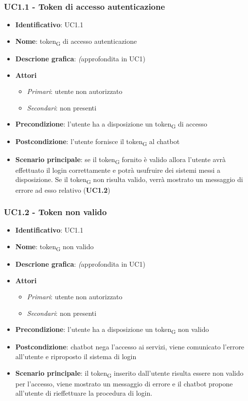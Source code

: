 \subsubsection{UC1.1 - Token di accesso autenticazione}
\begin{itemize}
    \item \textbf{Identificativo}: UC1.1
    \item \textbf{Nome}: token\textsubscript{G} di accesso autenticazione
    \item \textbf{Descrione grafica}: \textit(approfondita in UC1)
    \item \textbf{Attori}
 \begin{itemize} 
    \item \textit{Primari}: utente non autorizzato
    \item \textit{Secondari}: non presenti
 \end{itemize}
 \item \textbf{Precondizione}: l'utente ha a disposizione un token\textsubscript{G} di accesso
 \item \textbf{Postcondizione}: l'utente fornisce il token\textsubscript{G} al chatbot 
 \item \textbf{Scenario principale}: se il token\textsubscript{G} fornito è valido allora l'utente avrà effettuato il login correttamente e potrà usufruire dei sistemi messi a disposizione. Se il token\textsubscript{G} non risulta valido, verrà mostrato un messaggio di errore ad esso relativo (\textbf{UC1.2})
\end{itemize}

\subsubsection{UC1.2 - Token non valido}
\begin{itemize}
    \item \textbf{Identificativo}: UC1.1
    \item \textbf{Nome}: token\textsubscript{G} non valido
    \item \textbf{Descrione grafica}: \textit(approfondita in UC1)
    \item \textbf{Attori}
 \begin{itemize} 
    \item \textit{Primari}: utente non autorizzato 
    \item \textit{Secondari}: non presenti
 \end{itemize}
 \item \textbf{Precondizione}: l'utente ha a disposizione un token\textsubscript{G} non valido
 \item \textbf{Postcondizione}: chatbot nega l'accesso ai servizi, viene comunicato l'errore all'utente e riproposto il sistema di login 
 \item \textbf{Scenario principale}: il token\textsubscript{G} inserito dall'utente risulta essere non valido per l'accesso, viene mostrato un messaggio di errore e il chatbot propone all'utente di rieffettuare la procedura di login.
\end{itemize}
